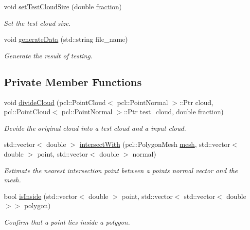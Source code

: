 \begin{DoxyCompactItemize}
void \hyperlink{classbenchmark_1_1_benchmark_a707e7974bcb0b5b2ee231e9e7cb142a8}{set\+Test\+Cloud\+Size} (double \hyperlink{classbenchmark_1_1_benchmark_ac05259c7c78e7f7fd12c8c573e96871e}{fraction})
\begin{DoxyCompactList}\small\item\em Set the test cloud size. \end{DoxyCompactList}\item 
void \hyperlink{classbenchmark_1_1_benchmark_a56970453ee4a690a35135ffc07dffb34}{generate\+Data} (std\+::string file\+\_\+name)
\begin{DoxyCompactList}\small\item\em Generate the result of testing. \end{DoxyCompactList}\end{DoxyCompactItemize}
\subsection*{Private Member Functions}
\begin{DoxyCompactItemize}
\item 
void \hyperlink{classbenchmark_1_1_benchmark_a9c9393327cf0af813804f8d46a2d1f5c}{divide\+Cloud} (pcl\+::\+Point\+Cloud$<$ pcl\+::\+Point\+Normal $>$\+::Ptr cloud, pcl\+::\+Point\+Cloud$<$ pcl\+::\+Point\+Normal $>$\+::Ptr \hyperlink{classbenchmark_1_1_benchmark_a9089b4dd75c60319db0450304c073828}{test\+\_\+cloud}, double \hyperlink{classbenchmark_1_1_benchmark_ac05259c7c78e7f7fd12c8c573e96871e}{fraction})
\begin{DoxyCompactList}\small\item\em Devide the original cloud into a test cloud and a input cloud. \end{DoxyCompactList}\item 
std\+::vector$<$ double $>$ \hyperlink{classbenchmark_1_1_benchmark_a72162e69a45d0070510691572b26a9b8}{intersect\+With} (pcl\+::\+Polygon\+Mesh \hyperlink{classbenchmark_1_1_benchmark_ac909ac5421efc317d13cccbe8049879d}{mesh}, std\+::vector$<$ double $>$ point, std\+::vector$<$ double $>$ normal)
\begin{DoxyCompactList}\small\item\em Estimate the nearest intersection point between a point\textquotesingle{}s normal vector and the mesh. \end{DoxyCompactList}\item 
bool \hyperlink{classbenchmark_1_1_benchmark_ab5b9175bdfcbec1aae85881b3c79f79b}{is\+Inside} (std\+::vector$<$ double $>$ point, std\+::vector$<$ std\+::vector$<$ double $>$$>$ polygon)
\begin{DoxyCompactList}\small\item\em Confirm that a point lies inside a polygon. \end{DoxyCompactList}\end{DoxyCompactItemize}

